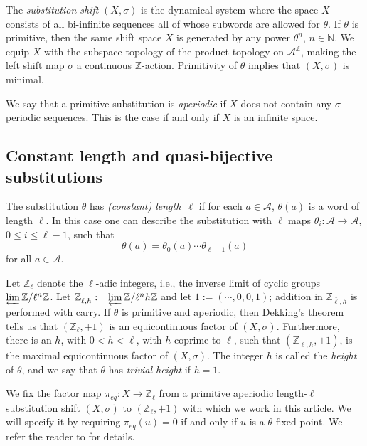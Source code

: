 \documentclass[10pt,a4paper]{amsart}
\numberwithin{equation}{section}
\newcommand{\Z}{\mathbb Z}
\newcommand{\N}{\mathbb N}
\newcommand{\Aa}{{\mathcal A}}
\newcommand{\pe}{\pi_{eq}}
\begin{document}
The {\em substitution shift} $( X,  \sigma)$ is the dynamical system where the space $X$  consists of all bi-infinite sequences 
all of whose subwords are allowed for $\theta$. If $\theta$ is primitive, then the same shift space $X$ is generated by any power $\theta^n$,  $n\in \N$.
We equip $X$ with the subspace topology of the product topology on $\Aa^\Z$, making the left shift map $\sigma$  a continuous  $\Z$-action. Primitivity  of $\theta$ implies that $(X,\sigma)$ is minimal.
    

We say that a primitive substitution is {\em aperiodic} if $X$ does not contain any $\sigma$-periodic sequences. This is the case if and only if $X$ is an infinite space. 


\subsection{Constant length and quasi-bijective substitutions }\label{def:quasi-bijective}

The substitution $\theta$ has
{\em (constant) length~$\ell$}  if for each $a\in \mathcal A$, 
$\theta (a)$ is a word of length $\ell$. In this case one can describe the substitution with  $\ell$ maps $\theta_i:\mathcal A \rightarrow \mathcal A$, $0\leq i \leq \ell-1$, such that
\begin{equation}\label{eq-as-perm}\nonumber
\theta(a) = \theta_0(a)\cdots \theta_{\ell-1}(a)
\end{equation}
for all $a\in\Aa$.

 Let $\Z_\ell$ denote the  $\ell$-adic integers, i.e., the inverse limit of cyclic groups $ \varprojlim \Z/\ell^n\Z $.  Let  $\Z_{\bar{\ell},h} :=  \varprojlim \Z/\ell^nh\Z $  and let $1 := (\cdots, 0,0,1)$; addition in $\Z_{\bar{\ell},h}$ is performed with carry.   
If $\theta$ is primitive and aperiodic, then Dekking's theorem \cite{dekking} tells us that   $(\Z_\ell, +1)$ is an equicontinuous factor of $(X, \sigma)$. Furthermore, 
there is an $h$, with $0<h<\ell$, with $h$ coprime to $\ell$, such that 
 $(\mathbb{Z}_{\bar{\ell},h}, +1)$, is  the maximal equicontinuous factor of  $(X, \sigma)$. The integer $h$ is called the {\em height} of $\theta$, and   we say that  $\theta$ has {\em trivial height} if $h=1$.

   We fix the factor map $\pe:X\rightarrow \Z_\ell$ from a primitive aperiodic length-$\ell$ substitution shift $(X,\sigma)$ to $(\Z_\ell,+1)$ with which we work in this article. We will specify it by requiring $\pe(u)=0$ if and only if $u$ is a $\theta$-fixed point. We refer the reader to \cite{dekking} for details.
\end{document}
